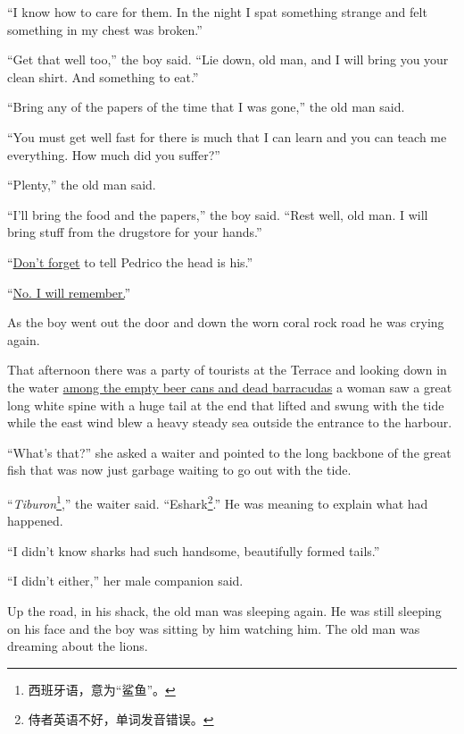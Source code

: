 ``I know how to care for them. In the night I spat something strange and
felt something in my chest was broken.''

``Get that well too,'' the boy said. ``Lie down, old man, and I will bring
you your clean shirt. And something to eat.''

``Bring any of the papers of the time that I was gone,'' the old man said.

``You must get well fast for there is much that I can learn and you can
teach me everything. How much did you suffer?''

``Plenty,'' the old man said.

``I'll bring the food and the papers,'' the boy said. ``Rest well, old man.
I will bring stuff from the \gls{drugstore} for your hands.''

``\uline{Don't forget} to tell Pedrico the head is his.''

``\uline{No. I will remember.}''

As the boy went out the door and down the worn coral rock road he was
crying again.

That afternoon there was a party of tourists at the Terrace and looking down
in the water \uline{among the empty beer cans and dead \glspl{barracuda}} a
woman saw a great long white \gls{spine} with a huge tail at the end that
lifted and swung with the \gls{tide} while the east wind blew a heavy steady
sea outside the \gls{entrance} to the harbour.

``What's that?'' she asked a waiter and pointed to the long backbone of the
great fish that was now just \gls{garbage} waiting to go out with the tide.

``\emph{Tiburon}\footnote{西班牙语，意为“鲨鱼”。},'' the waiter said.
``Eshark\footnote{侍者英语不好，单词发音错误。}.'' He was meaning to explain
what had happened.

``I didn't know sharks had such handsome, \gls{beautifully} formed tails.''

``I didn't either,'' her male \gls{companion} said.

Up the road, in his shack, the old man was sleeping again. He was still
sleeping on his face and the boy was sitting by him watching him. The old
man was dreaming about the lions.
